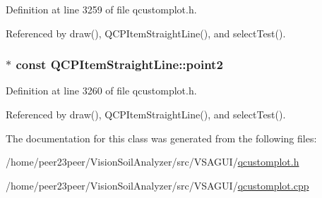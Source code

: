 Definition at line 3259 of file qcustomplot.\+h.



Referenced by draw(), Q\+C\+P\+Item\+Straight\+Line(), and select\+Test().

\hypertarget{class_q_c_p_item_straight_line_ad26c0a732e471f63f75d481dcd48cfc9}{}
\subsubsection[{point2}]{$\ast$ const Q\+C\+P\+Item\+Straight\+Line\+::point2}\label{class_q_c_p_item_straight_line_ad26c0a732e471f63f75d481dcd48cfc9}


Definition at line 3260 of file qcustomplot.\+h.



Referenced by draw(), Q\+C\+P\+Item\+Straight\+Line(), and select\+Test().



The documentation for this class was generated from the following files\+:\begin{DoxyCompactItemize}
\item 
/home/peer23peer/\+Vision\+Soil\+Analyzer/src/\+V\+S\+A\+G\+U\+I/\hyperlink{qcustomplot_8h}{qcustomplot.\+h}\item 
/home/peer23peer/\+Vision\+Soil\+Analyzer/src/\+V\+S\+A\+G\+U\+I/\hyperlink{qcustomplot_8cpp}{qcustomplot.\+cpp}\end{DoxyCompactItemize}
